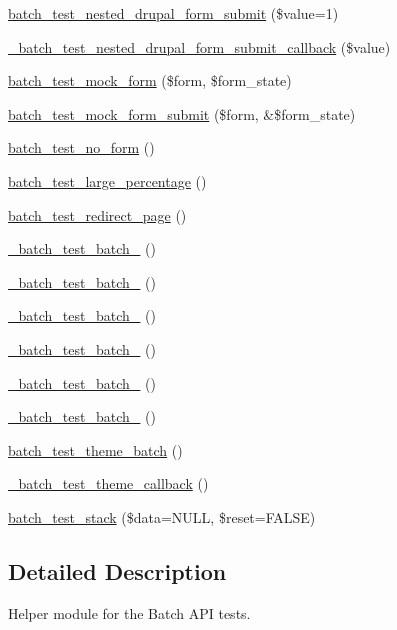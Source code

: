 \begin{DoxyCompactItemize}
\hyperlink{batch__test_8module_a72e164c6e83bd986e051745c2022ba84}{batch\_\-test\_\-nested\_\-drupal\_\-form\_\-submit} (\$value=1)
\item 
\hyperlink{batch__test_8module_ad87bcf9d5c91f742ead185492a0fc2d3}{\_\-batch\_\-test\_\-nested\_\-drupal\_\-form\_\-submit\_\-callback} (\$value)
\item 
\hyperlink{batch__test_8module_a1c7182cba99db81cb139b63d13ff0cba}{batch\_\-test\_\-mock\_\-form} (\$form, \$form\_\-state)
\item 
\hyperlink{batch__test_8module_ad3450e5ac793400df8fda5f388e994d5}{batch\_\-test\_\-mock\_\-form\_\-submit} (\$form, \&\$form\_\-state)
\item 
\hyperlink{batch__test_8module_ad1513af97268361ff1b0cdb36a44834b}{batch\_\-test\_\-no\_\-form} ()
\item 
\hyperlink{batch__test_8module_a61e2159da3c242f090bdddb92a0a9977}{batch\_\-test\_\-large\_\-percentage} ()
\item 
\hyperlink{batch__test_8module_afb3ec51700a61123e51f3db77ac91d73}{batch\_\-test\_\-redirect\_\-page} ()
\item 
\hyperlink{batch__test_8module_abe78c3c0260e06a43e2f18a3a548aae4}{\_\-batch\_\-test\_\-batch\_} ()
\item 
\hyperlink{batch__test_8module_a4d6633034b1ecabf144319b0914497bb}{\_\-batch\_\-test\_\-batch\_} ()
\item 
\hyperlink{batch__test_8module_a0830c7033c5e5527e28dee83f9a677c0}{\_\-batch\_\-test\_\-batch\_} ()
\item 
\hyperlink{batch__test_8module_a09e8fda0115a2f4b613bce7ff626336a}{\_\-batch\_\-test\_\-batch\_} ()
\item 
\hyperlink{batch__test_8module_acf897bcbd95ae9e8d37257f91c74ce03}{\_\-batch\_\-test\_\-batch\_} ()
\item 
\hyperlink{batch__test_8module_ac0b804aae71b8e81c340afe5543f380f}{\_\-batch\_\-test\_\-batch\_} ()
\item 
\hyperlink{batch__test_8module_ac3c6c00cf4a9425c1156a58d8a62b74e}{batch\_\-test\_\-theme\_\-batch} ()
\item 
\hyperlink{batch__test_8module_aac27af611539934c863ce75be5d0b0e3}{\_\-batch\_\-test\_\-theme\_\-callback} ()
\item 
\hyperlink{batch__test_8module_a94b2eb54ae9fc920654ceee3aa29786f}{batch\_\-test\_\-stack} (\$data=NULL, \$reset=FALSE)
\end{DoxyCompactItemize}


\subsection{Detailed Description}
Helper module for the Batch API tests. 


